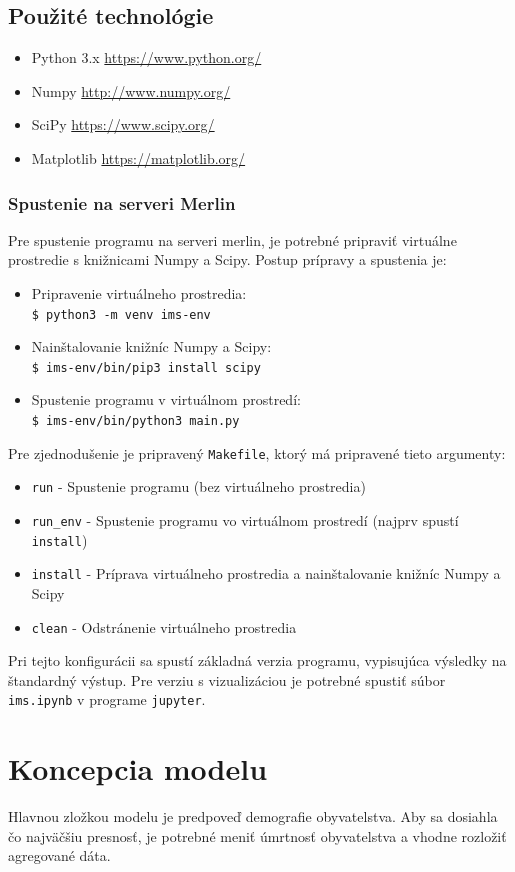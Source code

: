\documentclass[a4paper, 11pt]{article}
\begin{document}
\subsection{Použité technológie}
\begin{itemize}
\item Python 3.x \url{https://www.python.org/}
\item Numpy \url{http://www.numpy.org/}
\item SciPy \url{https://www.scipy.org/}
\item Matplotlib \url{https://matplotlib.org/}
\end{itemize}
\subsubsection{Spustenie na serveri Merlin}
Pre spustenie programu na serveri merlin, je potrebné pripraviť virtuálne prostredie s knižnicami Numpy a Scipy. Postup prípravy a spustenia je:
\begin{itemize}
\item Pripravenie virtuálneho prostredia:\\
\texttt{\$ python3 -m venv ims-env}
\item Nainštalovanie knižníc Numpy a Scipy:\\
\texttt{\$ ims-env/bin/pip3 install scipy}
\item Spustenie programu v virtuálnom prostredí:\\
\texttt{\$ ims-env/bin/python3 main.py}
\end{itemize}
Pre zjednodušenie je pripravený \texttt{Makefile}, ktorý má pripravené tieto argumenty:
\begin{itemize}
\item \texttt{run} - Spustenie programu (bez virtuálneho prostredia)
\item \texttt{run\_env} - Spustenie programu vo virtuálnom prostredí (najprv spustí \texttt{install})
\item \texttt{install} - Príprava virtuálneho prostredia a nainštalovanie knižníc Numpy a Scipy 
\item \texttt{clean} - Odstránenie virtuálneho prostredia
\end{itemize}
Pri tejto konfigurácii sa spustí základná verzia programu, vypisujúca výsledky na štandardný výstup. Pre verziu s vizualizáciou je potrebné spustiť súbor \texttt{ims.ipynb} v programe \texttt{jupyter}.

\section{Koncepcia modelu}
Hlavnou zložkou modelu je predpoveď demografie obyvatelstva. Aby sa dosiahla čo najväčšiu presnosť, je potrebné meniť úmrtnosť obyvatelstva a vhodne rozložiť agregované dáta.
\end{document}
